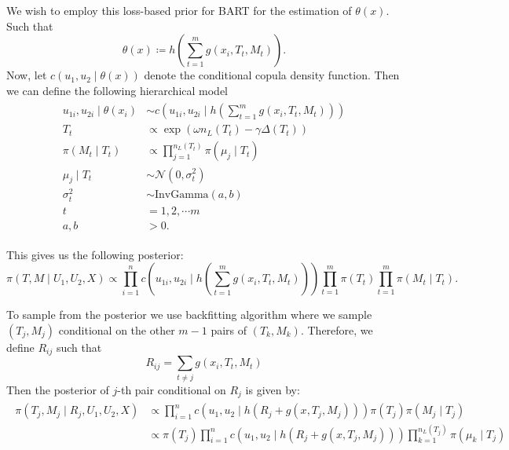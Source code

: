 \documentclass{amsart}
\begin{document}
We wish to employ this loss-based prior for BART for the estimation of $\theta(x)$. Such that 
\begin{equation*}
	\theta(x) \coloneqq h\left(\sum_{t=1}^m g(x_i, T_t, M_t)\right).
\end{equation*}
Now, let $c\left(u_1,u_2\mid \theta(x)\right)$ denote the conditional copula density function. Then we can define the following hierarchical model
\begin{align}
	\begin{split}
		u_{1i},u_{2i} \mid \theta(x_i) & \sim c\left(u_{1i},u_{2i}\mid h\left(\sum_{t=1}^m g(x_i, T_t, M_t)\right)\right)\\
		T_t &\propto \exp\left(\omega n_L(T_t)-\gamma\Delta(T_t)\right)\\
		\pi(M_t\mid T_t) &\propto \prod_{j=1}^{n_L(T_t)}\pi(\mu_j\mid T_t)\\
		\mu_j\mid T_t &\sim \mathcal{N}(0,\sigma_{t}^2)\\
		\sigma_{t}^2&\sim \text{InvGamma}(a,b)\\
		t & = 1,2,\cdots m\\
		a,b&>0.
	\end{split}
\end{align}

This gives us the following posterior:
\begin{equation}
	\pi(T,M \mid U_1, U_2, X) \propto \prod_{i=1}^{n}c\left(u_{1i},u_{2i}\mid h\left(\sum_{t=1}^m g(x_i, T_t, M_t)\right)\right)\prod_{t=1}^{m}\pi(T_t)\prod_{t=1}^{m}\pi(M_t\mid T_t).
\end{equation}

To sample from the posterior we use backfitting algorithm where we sample $(T_j, M_j)$ conditional on the other $m-1$ pairs of $(T_k,M_k)$. Therefore, we define $R_{ij}$ such that
\begin{equation*}
	R_{ij} = \sum_{t\not=j}g(x_i, T_t, M_t)
\end{equation*}
Then the posterior of $j$-th pair conditional on $R_j$ is given by:
\begin{align}\label{eq:post:res}
	\begin{split}
		\pi(T_j,M_j \mid R_j, U_1,U_2, X) &\propto \prod_{i=1}^{n}c\left(u_{1},u_{2}\mid h\left(R_j+g(x, T_j, M_j)\right)\right)\pi(T_j)\pi(M_j\mid T_j)\\
		&\propto \pi(T_j)\prod_{i=1}^{n}c\left(u_{1},u_{2}\mid h\left(R_j+g(x, T_j, M_j)\right)\right)\prod_{k=1}^{n_L(T_j)}\pi(\mu_k\mid T_j)
	\end{split}
\end{align}
\end{document}
